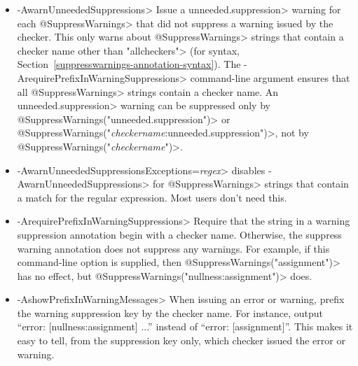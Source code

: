 \begin{itemize}
  With each warning, show all possible strings to suppress that warning.
\item \<-AwarnUnneededSuppressions>
  Issue a \<unneeded.suppression> warning for each \<@SuppressWarnings>
  that did not suppress a warning
  issued by the checker.  This only warns about
  \<@SuppressWarnings> strings that contain a checker name
  other than \<"allcheckers">
  (for syntax, Section~\ref{suppresswarnings-annotation-syntax}).  The
  \<-ArequirePrefixInWarningSuppressions> command-line argument ensures
  that all \<@SuppressWarnings> strings contain a checker name.
  An \<unneeded.suppression> warning can be suppressed only by
  \<@SuppressWarnings("unneeded.suppression")>
  or \<@SuppressWarnings("\emph{checkername}:unneeded.suppression")>,
  not by \<@SuppressWarnings("\emph{checkername}")>.
\item \<-AwarnUnneededSuppressionsExceptions=\emph{regex}> disables
  \<-AwarnUnneededSuppressions> for \<@SuppressWarnings> strings that
  contain a match for the regular expression.  Most users don't need this.
\item \<-ArequirePrefixInWarningSuppressions>
  Require that the string in a warning suppression annotation begin with a checker
  name.  Otherwise, the suppress warning annotation does not
  suppress any warnings.  For example, if this command-line option is
  supplied, then \<@SuppressWarnings("assignment")> has no effect, but
  \<@SuppressWarnings("nullness:assignment")> does.
\item \<-AshowPrefixInWarningMessages>
  When issuing an error or warning, prefix the warning suppression key by
  the checker name.  For instance, output ``error: [nullness:assignment]
  ...'' instead of ``error: [assignment]''.  This makes it easy to tell,
  from the suppression key only, which checker issued the error or warning.
\end{itemize}

